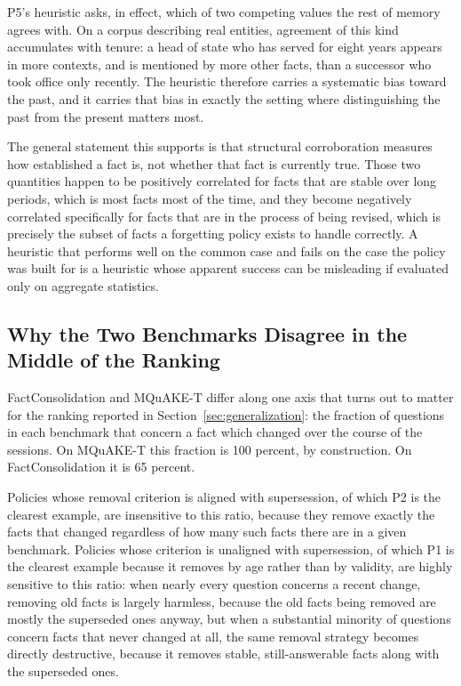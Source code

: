 P5's heuristic asks, in effect, which of two competing values the rest of memory agrees with. On a corpus describing real entities, agreement of this kind accumulates with tenure: a head of state who has served for eight years appears in more contexts, and is mentioned by more other facts, than a successor who took office only recently. The heuristic therefore carries a systematic bias toward the past, and it carries that bias in exactly the setting where distinguishing the past from the present matters most.

The general statement this supports is that structural corroboration measures how established a fact is, not whether that fact is currently true. Those two quantities happen to be positively correlated for facts that are stable over long periods, which is most facts most of the time, and they become negatively correlated specifically for facts that are in the process of being revised, which is precisely the subset of facts a forgetting policy exists to handle correctly. A heuristic that performs well on the common case and fails on the case the policy was built for is a heuristic whose apparent success can be misleading if evaluated only on aggregate statistics.

\subsection{Why the Two Benchmarks Disagree in the Middle of the Ranking}
\label{sec:why-benchmarks-disagree}

FactConsolidation and MQuAKE-T differ along one axis that turns out to matter for the ranking reported in Section~\ref{sec:generalization}: the fraction of questions in each benchmark that concern a fact which changed over the course of the sessions. On MQuAKE-T this fraction is 100 percent, by construction. On FactConsolidation it is 65 percent.

Policies whose removal criterion is aligned with supersession, of which P2 is the clearest example, are insensitive to this ratio, because they remove exactly the facts that changed regardless of how many such facts there are in a given benchmark. Policies whose criterion is unaligned with supersession, of which P1 is the clearest example because it removes by age rather than by validity, are highly sensitive to this ratio: when nearly every question concerns a recent change, removing old facts is largely harmless, because the old facts being removed are mostly the superseded ones anyway, but when a substantial minority of questions concern facts that never changed at all, the same removal strategy becomes directly destructive, because it removes stable, still-answerable facts along with the superseded ones.

